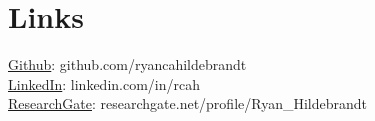 \documentclass[letterpaper]{deedy-resume_sm} %
\begin{document}
\section{Links} 
\href{https://github.com/ryancahildebrandt}{Github}: github.com/ryancahildebrandt \\
\href{https://linkedin.com/in/rcah}{LinkedIn}: linkedin.com/in/rcah \\
\href{https://researchgate.net/profile/Ryan\_Hildebrandt}{ResearchGate}: researchgate.net/profile/Ryan\_Hildebrandt 
\hfill



\end{document}
